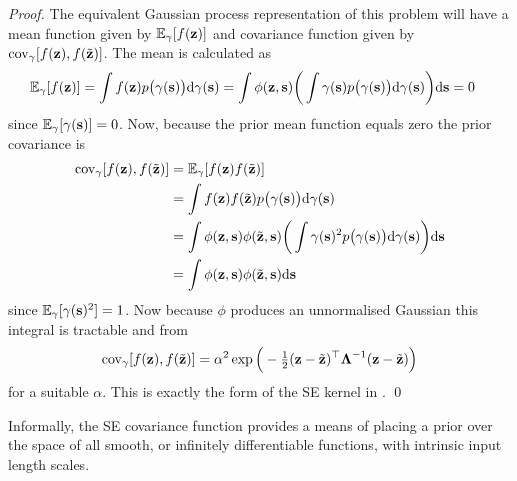 \begin{proof}
The equivalent Gaussian process representation of this problem will have a mean function given by $\mathbb{E}_{\gamma}[f(\mathbf{z})]$ and covariance function given by $\mathrm{cov}_{\gamma}[f(\mathbf{z}),f(\tilde{\mathbf{z}})] $. The mean is calculated as
\begin{align*}
\mathbb{E}_{\gamma}[f(\mathbf{z})] &= \int f(\mathbf{z}) p\big(\gamma(\mathbf{s})\big) \mathrm{d}\gamma(\mathbf{s}) 
= \int \phi(\mathbf{z},\mathbf{s}) \bigg( \int \gamma(\mathbf{s}) p\big(\gamma(\mathbf{s})\big) \mathrm{d}\gamma(\mathbf{s}) \bigg) \mathrm{d}\mathbf{s} = 0
\end{align*}
since $\mathbb{E}_{\gamma}[\gamma(\mathbf{s})] = 0$. Now, because the prior mean function equals zero the prior covariance is
\begin{align*}
\mathrm{cov}_{\gamma}[f(\mathbf{z}),f(\tilde{\mathbf{z}})] &= \mathbb{E}_{\gamma}[f(\mathbf{z})f(\tilde{\mathbf{z}})] \\
&= \int f(\mathbf{z}) f(\tilde{\mathbf{z}}) p\big(\gamma(\mathbf{s})\big) \mathrm{d}\gamma(\mathbf{s}) \\
&= \int \phi(\mathbf{z},\mathbf{s}) \phi(\tilde{\mathbf{z}},\mathbf{s}) \bigg( \int \gamma(\mathbf{s})^2 p\big(\gamma(\mathbf{s})\big) \mathrm{d}\gamma(\mathbf{s}) \bigg) \mathrm{d}\mathbf{s} \\
&= \int \phi(\mathbf{z},\mathbf{s}) \phi(\tilde{\mathbf{z}},\mathbf{s}) \mathrm{d}\mathbf{s}
\end{align*}
since $\mathbb{E}_{\gamma}[\gamma(\mathbf{s})^2] = 1$. Now because $\phi$ produces an unnormalised Gaussian this integral is tractable and from 
\begin{equation*}
\mathrm{cov}_{\gamma}[f(\mathbf{z}),f(\tilde{\mathbf{z}})] = \alpha^2 \exp\Big(-\tfrac{1}{2}(\mathbf{z} - \tilde{\mathbf{z}})^\top\boldsymbol{\Lambda}^{-1}(\mathbf{z} - \tilde{\mathbf{z}}) \Big)
\end{equation*}
for a suitable $\alpha$. This is exactly the form of the SE kernel in .
\qed
\end{proof}

Informally, the SE covariance function provides a means of placing a prior over the space of all smooth, or infinitely differentiable functions, with intrinsic input length scales. 




